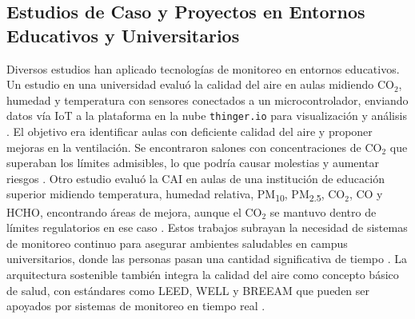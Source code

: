 \subsection{Estudios de Caso y Proyectos en Entornos Educativos y Universitarios}
Diversos estudios han aplicado tecnologías de monitoreo en entornos educativos. Un estudio en una universidad evaluó la calidad del aire en aulas midiendo CO\(_2\), humedad y temperatura con sensores conectados a un microcontrolador, enviando datos vía IoT a la plataforma en la nube \texttt{thinger.io} para visualización y análisis \cite{contreras_perez_2020}. El objetivo era identificar aulas con deficiente calidad del aire y proponer mejoras en la ventilación. Se encontraron salones con concentraciones de CO\(_2\) que superaban los límites admisibles, lo que podría causar molestias y aumentar riesgos \cite{contreras_perez_2020}.
Otro estudio evaluó la CAI en aulas de una institución de educación superior midiendo temperatura, humedad relativa, PM\textsubscript{10}, PM\textsubscript{2.5}, CO\(_2\), CO y HCHO, encontrando áreas de mejora, aunque el CO\(_2\) se mantuvo dentro de límites regulatorios en ese caso \cite{sandoval_etal_2020}. Estos trabajos subrayan la necesidad de sistemas de monitoreo continuo para asegurar ambientes saludables en campus universitarios, donde las personas pasan una cantidad significativa de tiempo \cite{its_about_time_a_comparison_of_canadian_and_american_time_activity_patterns}. La arquitectura sostenible también integra la calidad del aire como concepto básico de salud, con estándares como LEED, WELL y BREEAM que pueden ser apoyados por sistemas de monitoreo en tiempo real \cite{envira_nodate}.

